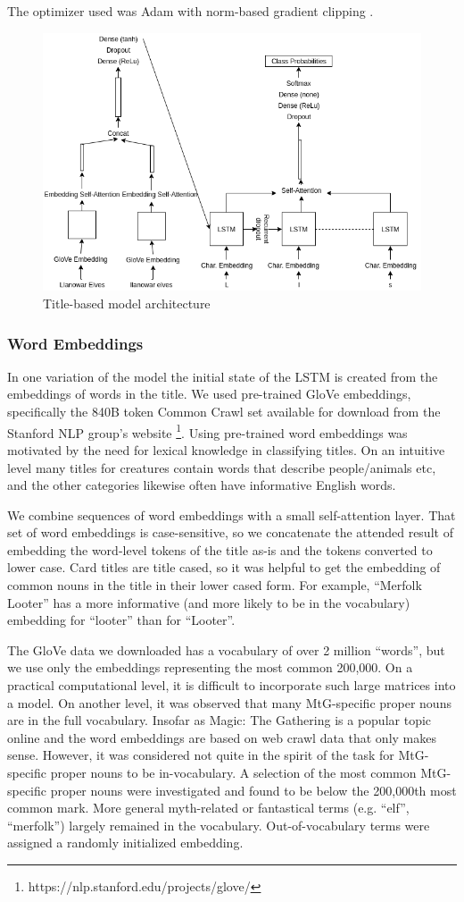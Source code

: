 \documentclass[letterpaper]{article} %
\begin{document}
The optimizer used was Adam \cite{Kingma2014AdamAM}
with norm-based gradient clipping \cite{Pascanu2012UnderstandingTE}.

\begin{figure}
  \centering
  \includegraphics[width=.45\textwidth]{text-architecture}
  \caption{Title-based model architecture}
\end{figure}

\subsubsection{Word Embeddings}

In one variation of the model
the initial state of the LSTM
is created from the embeddings of words in the title.
We used pre-trained GloVe \cite{Pennington2014GloveGV} embeddings,
specifically the 840B token Common Crawl set
available for download from the Stanford NLP group's website
\footnote{https://nlp.stanford.edu/projects/glove/}.
Using pre-trained word embeddings
was motivated by the need for lexical knowledge in classifying titles.
On an intuitive level many titles for creatures
contain words that describe people/animals etc,
and the other categories likewise often have informative English words.

We combine sequences of word embeddings with a small self-attention layer.
That set of word embeddings is case-sensitive,
so we concatenate the attended result of embedding
the word-level tokens of the title as-is
and the tokens converted to lower case.
Card titles are title cased,
so it was helpful to get the embedding of common nouns in the title
in their lower cased form.
For example,
``Merfolk Looter''
has a more informative (and more likely to be in the vocabulary)
embedding for ``looter'' than for ``Looter''.

The GloVe data we downloaded has a vocabulary of over 2 million ``words'',
but we use only the embeddings representing the most common 200,000.
On a practical computational level,
it is difficult to incorporate such large matrices into a model.
On another level,
it was observed that many MtG-specific proper nouns are in the full vocabulary.
Insofar as Magic: The Gathering is a popular topic online and the word embeddings
are based on web crawl data that only makes sense.
However,
it was considered not quite in the spirit of the task
for MtG-specific proper nouns to be in-vocabulary.
A selection of the most common MtG-specific proper nouns were investigated
and found to be below the 200,000th most common mark.
More general myth-related or fantastical terms (e.g. ``elf'', ``merfolk'')
largely remained in the vocabulary.
Out-of-vocabulary terms were assigned a randomly initialized embedding.
\end{document}
